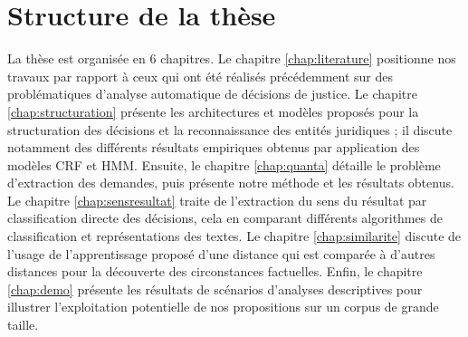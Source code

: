 \section{Structure de la thèse}
\label{sec:intro:organisation}

La thèse est organisée en 6 chapitres. Le chapitre \ref{chap:literature} positionne nos travaux par rapport à ceux qui ont été réalisés précédemment sur des problématiques d'analyse automatique de décisions de justice. Le chapitre \ref{chap:structuration} présente les architectures et modèles proposés pour la structuration des décisions et la reconnaissance des entités juridiques ; il discute notamment des différents résultats empiriques obtenus par application des modèles CRF et HMM. Ensuite, le chapitre \ref{chap:quanta} détaille le problème  d'extraction des demandes, puis présente notre méthode et les résultats obtenus. Le chapitre \ref{chap:sensresultat} traite de l'extraction du sens du résultat par classification directe des décisions, cela en comparant différents algorithmes de classification et représentations des textes. Le chapitre \ref{chap:similarite} discute de l'usage de l'apprentissage proposé d'une distance qui est comparée à d'autres distances pour la découverte des circonstances factuelles. Enfin, le chapitre \ref{chap:demo} présente les résultats de scénarios d'analyses descriptives pour illustrer l'exploitation potentielle de nos propositions sur un corpus de grande taille. 
